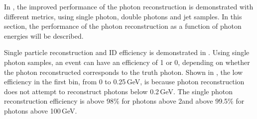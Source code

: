 In , the improved performance of the photon reconstruction is demonstrated with different metrics, using single photon, double photons and jet samples. In this section, the performance of the photon reconstruction as a function of photon energies will be described.


Single particle reconstruction and ID efficiency is demonstrated in . Using single photon samples, an event can have an efficiency of 1 or 0, depending on whether the photon reconstructed corresponds to the truth photon. Shown in , the low efficiency in the first bin, from 0 to 0.25\,GeV, is because photon reconstruction does not attempt to reconstruct photons below 0.2\,GeV.  The single photon reconstruction efficiency is above 98\% for photons above 2\GeV and above 99.5\% for photons above 100\,GeV.

